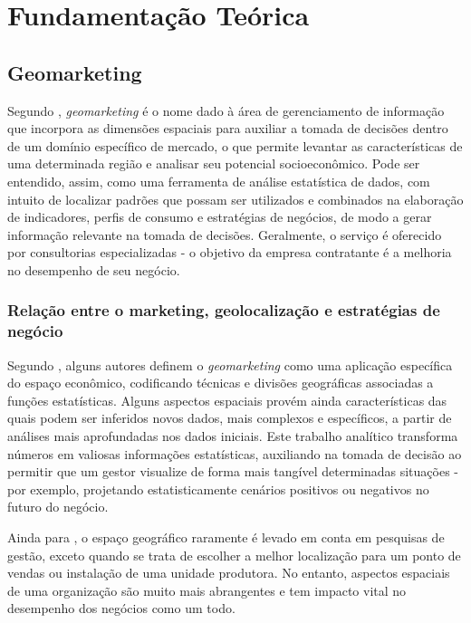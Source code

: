 
\chapter{Fundamentação Teórica}
\label{fundamentacao-teorica}

\section{Geomarketing}
\label{Geom}
Segundo , \emph{geomarketing} é o nome dado à área de
gerenciamento de informação que incorpora as dimensões espaciais para auxiliar a
tomada de decisões dentro de um domínio específico de mercado, o que permite
levantar as características de uma determinada região e analisar seu potencial
socioeconômico. Pode ser entendido, assim, como uma ferramenta de análise
estatística de dados, com intuito de localizar padrões que possam ser utilizados
e combinados na elaboração de indicadores, perfis de consumo e estratégias de
negócios, de modo a gerar informação relevante na tomada de decisões.
Geralmente, o serviço é oferecido por consultorias especializadas - o  objetivo
da empresa contratante é a melhoria no desempenho de seu negócio.

\subsection{Relação entre o marketing, geolocalização e estratégias de negócio}
Segundo , alguns autores definem o \emph{geomarketing} como uma aplicação específica do espaço econômico, codificando técnicas e divisões geográficas associadas a funções estatísticas. Alguns aspectos espaciais provém ainda características das quais podem ser inferidos novos dados, mais complexos e específicos, a partir de análises mais aprofundadas nos dados iniciais. Este trabalho analítico transforma números em valiosas informações estatísticas, auxiliando na tomada de decisão ao permitir que um gestor visualize de forma mais tangível determinadas situações - por exemplo, projetando estatisticamente cenários positivos ou negativos no futuro do negócio.

Ainda para , o espaço geográfico raramente é levado em conta em pesquisas de gestão, exceto quando se trata de escolher a melhor localização para um ponto de vendas ou instalação de uma unidade produtora. No entanto, aspectos espaciais de uma organização são muito mais abrangentes e tem impacto vital no desempenho dos negócios como um todo.

